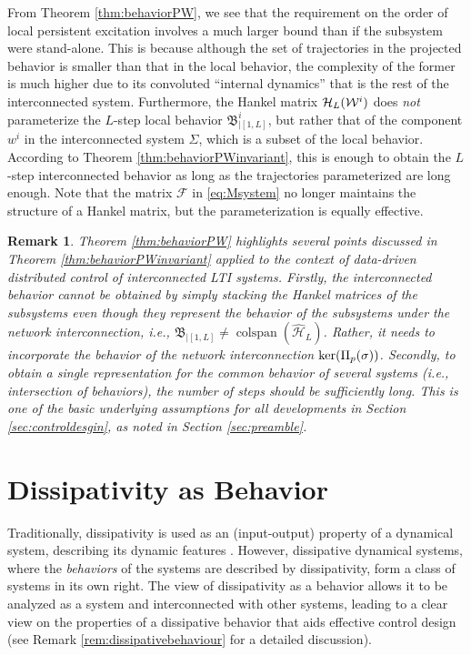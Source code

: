 \documentclass[11pt,print,draftcls,onecolumn,romanappendices]{ieeecolor}
\newtheorem{rem}{Remark}
\DeclareMathOperator{\cs}{colspan}
\newcommand{\revise}[1]{{\color{black} #1}}
\newcommand{\B}{\mathfrak{B}}
\newcommand{\F}{\mathcal{F}}
\newcommand{\Hk}{\mathcal{H}}
\newcommand{\bint}[1]{{|[#1]}}
\begin{document}
From Theorem \ref{thm:behaviorPW}, we see that the requirement \revise{on} the order of local persistent excitation \revise{involves a much larger bound} than if the subsystem were stand-alone. This is because although the set of trajectories in the projected behavior is smaller than that in the local behavior, the complexity of the former is much higher due to its convoluted ``internal dynamics'' that is the rest of the interconnected system. Furthermore, the Hankel matrix $\Hk_L(\revise{\mathcal{W}}^i)$ does \emph{not} parameterize the $L$-step local behavior $\B_\bint{1,L}^i$, but rather that of the component $w^i$ in the interconnected system $\Sigma$, which is a subset of the local behavior. According to Theorem \ref{thm:behaviorPWinvariant}, this is enough to obtain the $L$-step interconnected behavior as long as the trajectories parameterized are long enough. Note that the matrix $\F $ in \eqref{eq:Msystem} no longer maintains the structure of a Hankel matrix, but the parameterization is equally effective.

\revise{\begin{rem}
	Theorem \ref{thm:behaviorPW} highlights several points discussed in Theorem \ref{thm:behaviorPWinvariant} applied to the context of data-driven distributed control of interconnected LTI systems. Firstly, the interconnected behavior \emph{cannot} be obtained by simply stacking the Hankel matrices of the subsystems even though they represent the behavior of the subsystems under the network interconnection, i.e., $\B_\bint{1,L}\neq\cs(\widehat{\mathcal{H}}_L)$. Rather, it needs to incorporate the behavior of the network interconnection $\revise{\ker(\Pi_p(\sigma))}$. Secondly, to obtain a single representation for the common behavior of several systems (i.e., intersection of behaviors), the number of steps should be sufficiently long. This is one of the basic underlying assumptions for all developments in Section \ref{sec:controldesgin}, as noted in Section \ref{sec:preamble}.
\end{rem}}

\section{Dissipativity as Behavior}\label{sec:dissipativity}
Traditionally, dissipativity is used as an (input-output) property of a dynamical system,  describing its dynamic features \cite{Willems:1972}.  However, dissipative dynamical systems, where the \emph{behaviors} of the systems are described by dissipativity, form a class of systems in its own right. The view of dissipativity as a behavior allows it to be analyzed as a system and interconnected with other systems, leading to a clear view on the properties of a dissipative behavior that aids effective control design (see Remark \ref{rem:dissipativebehaviour} for a detailed discussion).
\end{document}
